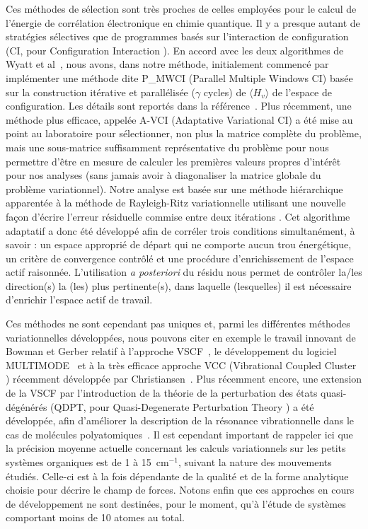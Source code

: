 Ces méthodes de sélection sont très proches de celles employées pour le calcul de l'énergie de corrélation électronique en chimie quantique. Il y a presque autant de stratégies sélectives que de programmes basés sur l'interaction de configuration (CI, pour \og Configuration Interaction \fg{}). En accord avec les deux algorithmes de Wyatt et al~\cite{wyatt1995toward}, nous avons, dans notre méthode, initialement commencé par implémenter une méthode dite P\_MWCI (Parallel Multiple Windows CI) basée sur la construction itérative et parallélisée ($\gamma$ cycles) de $\langle H_{v} \rangle$ de l’espace de configuration. Les détails sont reportés dans la référence~\cite{begue2007comparison}. Plus récemment, une méthode plus efficace, appelée A-VCI (Adaptative Variational CI) a été mise au point au laboratoire pour sélectionner, non plus la matrice complète du problème, mais une sous-matrice suffisamment représentative du problème pour nous permettre d’être en mesure de calculer les premières valeurs propres d’intérêt pour nos analyses (sans jamais avoir à diagonaliser la matrice globale du problème variationnel). Notre analyse est basée sur une méthode hiérarchique apparentée à la méthode de Rayleigh-Ritz variationnelle utilisant une nouvelle façon d’écrire l’erreur résiduelle commise entre deux itérations \cite{garnier2016adaptive}. Cet algorithme adaptatif a donc été développé afin de corréler trois conditions simultanément, à savoir : un espace approprié de départ qui ne comporte aucun \og trou \fg{} énergétique, un critère de convergence contrôlé et une procédure d’enrichissement de l'espace actif raisonnée. L’utilisation \textit{a posteriori} du résidu nous permet de contrôler la/les direction(s) la (les) plus pertinente(s), dans laquelle (lesquelles) il est nécessaire d’enrichir l’espace actif de travail.

Ces méthodes ne sont cependant pas uniques et, parmi les différentes méthodes variationnelles développées, nous pouvons citer en exemple le travail innovant de Bowman et Gerber relatif à l'approche VSCF~\cite{bowman1978self,bowman1986self,gerber1988self,gerber1979semiclassical}, le développement du logiciel MULTIMODE~\cite{carter2009high} et à la très efficace approche VCC (\og Vibrational Coupled Cluster \fg{}) récemment développée par Christiansen~\cite{sparta2010using}. Plus récemment encore, une extension de la VSCF par l'introduction de la théorie de la perturbation des états quasi-dégénérés (QDPT, pour \og Quasi-Degenerate Perturbation Theory \fg{}) a été développée, afin d'améliorer la description de la résonance vibrationnelle dans le cas de molécules polyatomiques~\cite{yagi2008vibrational}. Il est cependant important de rappeler ici que la précision moyenne actuelle concernant les calculs variationnels sur les petits systèmes organiques est de 1 à 15~cm$^{-1}$, suivant la nature des mouvements étudiés. Celle-ci est à la fois dépendante de la qualité et de la forme analytique choisie pour décrire le champ de forces. Notons enfin que ces approches en cours de développement ne sont destinées, pour le moment, qu’à l’étude de systèmes comportant moins de 10 atomes au total.


